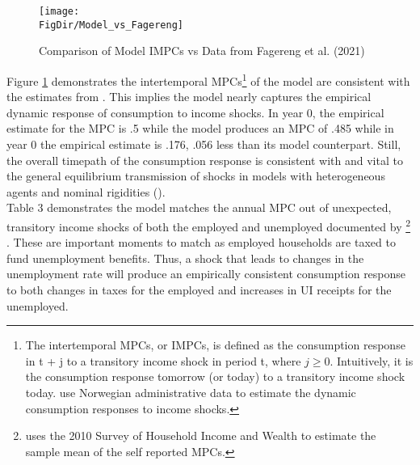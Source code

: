 \documentclass[titlepage]{\econtex}\providecommand{\texname}{Dissertation-Proposal}
\providecommand{\FigDir}{Figures}
\begin{document}
\begin{figure}
    \centering
     \caption{Comparison of Model IMPCs vs Data from Fagereng et al. (2021)}
    \texttt{[image: \\FigDir/Model\_vs\_Fagereng]}
    \label{fig:IMPCs}
\end{figure}

Figure \ref{fig:IMPCs} demonstrates the intertemporal MPCs\footnote{The intertemporal MPCs, or IMPCs, is defined as the consumption response in t + j to a transitory income shock in period t, where $j \geq 0$. Intuitively, it is the consumption response tomorrow (or today) to a transitory income shock today. \cite{Fagereng2021} use Norwegian administrative data to estimate the dynamic consumption responses to income shocks. } of the model are consistent with the estimates from \cite{Fagereng2021}. This implies the model nearly captures the empirical dynamic response of consumption to income shocks. In year 0, the empirical estimate for the MPC is .5 while the model produces an MPC of .485 while in year 0 the empirical estimate is .176, .056 less than its model counterpart. Still, the overall timepath of the consumption response is consistent with \cite{Fagereng2021} and vital to the general equilibrium transmission of shocks in models with heterogeneous agents and nominal rigidities (\cite{auclert2018intertemporal}). \\
 
 

Table 3 demonstrates the model matches the annual MPC out of unexpected, transitory income shocks of both the employed and unemployed documented by \cite{Kekre2021} \footnote{\cite{Kekre2021} uses the 2010 Survey of Household Income and Wealth to estimate the sample mean of the self reported MPCs.} . These are important moments to match as employed households are taxed to fund unemployment benefits. Thus, a shock that leads to changes in the unemployment rate will produce an empirically consistent consumption response to both changes in taxes for the employed and increases in UI receipts for the unemployed. \\
\end{document}
